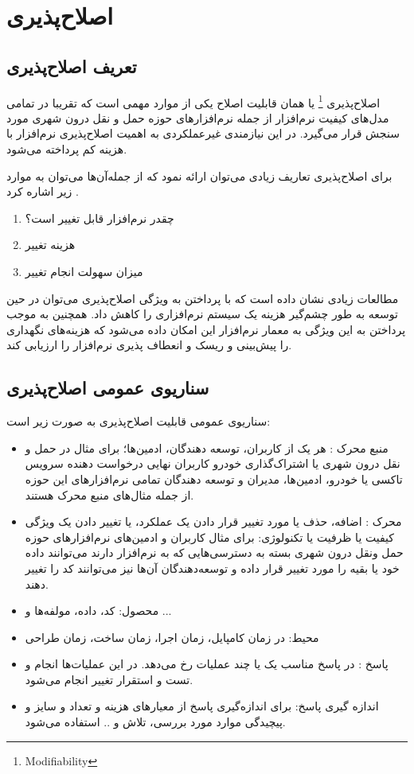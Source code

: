 \chapter{اصلاح‌پذیری}
\section{تعریف اصلاح‌پذیری}
اصلاح‌پذیری
\footnote{Modifiability}
یا همان قابلیت اصلاح یکی از موارد مهمی است که تقریبا در تمامی مدل‌های کیفیت نرم‌افزار از جمله نرم‌افزارهای حوزه حمل و نقل درون شهری مورد سنجش قرار می‌گیرد. در این نیازمندی غیرعملکردی به اهمیت اصلاح‌پذیری نرم‌افزار با هزینه کم پرداخته می‌شود.

برای اصلاح‌پذیری تعاریف زیادی می‌توان ارائه نمود که از جمله‌آن‌ها می‌توان به موارد زیر اشاره کرد  \cite{ciubuancan2020empirical}.
\begin{enumerate}
\item
چقدر نرم‌افزار قابل تغییر است؟
\item 
هزینه تغییر 
\item
میزان سهولت انجام تغییر
\end{enumerate}

مطالعات زیادی نشان داده است که با پرداختن به ویژگی اصلاح‌پذیری می‌توان در حین توسعه به طور چشم‌گیر هزینه یک سیستم‌ نرم‌افزاری را کاهش داد.
همچنین به موجب پرداختن به این ویژگی به معمار نرم‌افزار این امکان داده می‌شود که هزینه‌های نگهداری را پیش‌بینی و ریسک و انعطاف پذیری نرم‌افزار را ارزیابی کند.

\section{سناریوی عمومی اصلاح‌پذیری}

سناریو‌ی عمومی قابلیت اصلاح‌پذیری به صورت زیر است:
\begin{itemize}
\item
منبع محرک : هر یک از کاربران، توسعه دهندگان، ادمین‌ها؛ برای مثال در حمل و نقل درون شهری یا اشتراک‌گذاری خودرو کاربران نهایی درخواست دهنده سرویس تاکسی یا خودرو، ادمین‌ها، مدیران و توسعه دهندگان تمامی نرم‌افزارهای این حوزه از جمله مثال‌های منبع محرک هستند.
\item
محرک : اضافه، حذف یا مورد تغییر قرار دادن یک عملکرد، یا تغییر دادن یک ویژگی کیفیت یا ظرفیت یا تکنولوژی: برای مثال کاربران و ادمین‌های نرم‌افزارهای حوزه حمل ونقل درون شهری بسته به دسترسی‌هایی که به نرم‌افزار دارند می‌توانند داده خود یا بقیه را مورد تغییر قرار داده و توسعه‌دهندگان آن‌ها نیز می‌توانند کد را تغییر دهند.
\item
محصول:  کد، داده، مولفه‌ها و ...
\item
محیط: در زمان کامپایل، زمان اجرا، زمان ساخت، زمان طراحی
\item
پاسخ : در پاسخ مناسب یک یا چند عملیات رخ می‌دهد. 
در این عملیات‌ها انجام و تست و استقرار تغییر انجام می‌شود.
\item
اندازه گیری پاسخ: برای اندازه‌گیری پاسخ از معیار‌‌های هزینه و تعداد و سایز و پیچیدگی موارد مورد بررسی، تلاش و .. استفاده می‌شود.
\end{itemize}

